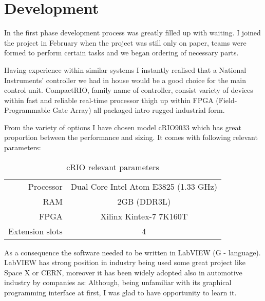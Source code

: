 \chapter{Development}
In the first phase development process was greatly filled up with waiting. I joined the project in February when the project was still only on paper, teams were formed to perform certain tasks and we began ordering of necessary parts.

Having experience within similar systems I instantly realised that a National Instruments' controller we had in house would be a good choice for the main control unit. CompactRIO, family name of controller, consist variety of devices within fast and reliable real-time processor thigh up within FPGA (Field-Programmable Gate Array) all packaged intro rugged industrial form.

From the variety of options I have chosen model cRIO9033 which has great proportion between the performance and sizing. It comes with following relevant parameters:
\begin{table*}[H]
    \centering
    \begin{tabular}{r|c}
        Processor & Dual Core Intel Atom E3825 (1.33 GHz) \\
        RAM & 2GB (DDR3L) \\
        FPGA & Xilinx Kintex-7 7K160T \\
        Extension slots & 4
    \end{tabular}
    \caption{cRIO relevant parameters}
    \label{tab:cRIO_param}
\end{table*}

As a consequence the software needed to be written in LabVIEW (G - language). LabVIEW has strong position in industry being used some great project like Space X or CERN, moreover it has been widely adopted also in automotive industry by companies as:
Although, being unfamiliar with its graphical programming interface at first, I was glad to have opportunity to learn it. 
